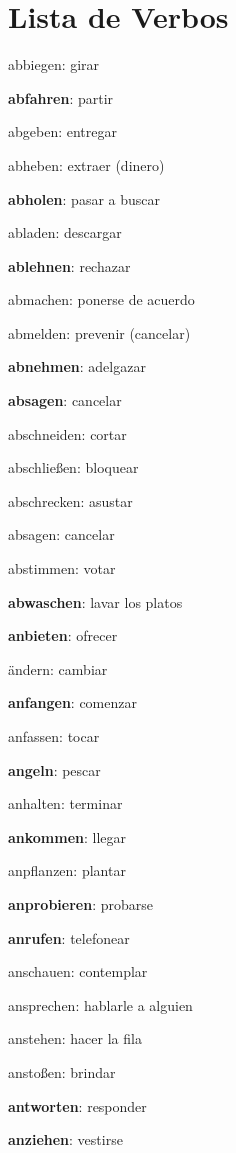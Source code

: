 \section{Lista de Verbos}
\begin{multicols}{2}
\begin{myitemize}
\item abbiegen: girar
\item \textbf{abfahren}: partir
\item abgeben: entregar
\item abheben: extraer (dinero)
\item \textbf{abholen}: pasar a buscar
\item abladen: descargar
\item \textbf{ablehnen}: rechazar
\item abmachen: ponerse de acuerdo
\item abmelden: prevenir (cancelar)
\item \textbf{abnehmen}: adelgazar
\item \textbf{absagen}: cancelar
\item abschneiden: cortar
\item abschließen: bloquear
\item abschrecken: asustar
\item absagen: cancelar
\item abstimmen: votar
\item \textbf{abwaschen}: lavar los platos
\item \textbf{anbieten}: ofrecer
\item ändern: cambiar
\item \textbf{anfangen}: comenzar
\item anfassen: tocar
\item \textbf{angeln}: pescar
\item anhalten: terminar
\item \textbf{ankommen}: llegar
\item anpflanzen: plantar
\item \textbf{anprobieren}: probarse
\item \textbf{anrufen}: telefonear
\item anschauen: contemplar
\item ansprechen: hablarle a alguien
\item anstehen: hacer la fila
\item anstoßen: brindar
\item \textbf{antworten}: responder
\item \textbf{anziehen}: vestirse

\end{myitemize}
\end{multicols}
